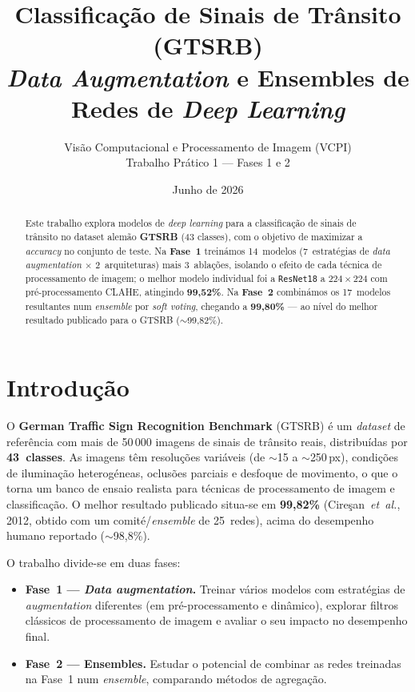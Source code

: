 \documentclass[11pt,a4paper]{article}
\title{\textbf{Classificação de Sinais de Trânsito (GTSRB)}\\[0.3em]
\large \emph{Data Augmentation} e Ensembles de Redes de \emph{Deep Learning}}
\author{Visão Computacional e Processamento de Imagem (VCPI)\\ Trabalho Prático 1 --- Fases 1 e 2}
\date{Junho de 2026}
\begin{document}
\maketitle

\begin{abstract}
\noindent
Este trabalho explora modelos de \emph{deep learning} para a classificação de sinais de
trânsito no dataset alemão \textbf{GTSRB} (43 classes), com o objetivo de maximizar a
\emph{accuracy} no conjunto de teste. Na \textbf{Fase~1} treinámos 14~modelos
(7~estratégias de \emph{data augmentation} $\times$ 2~arquiteturas) mais 3~ablações,
isolando o efeito de cada técnica de processamento de imagem; o melhor modelo individual
foi a \texttt{ResNet18} a $224\times224$ com pré-processamento CLAHE, atingindo
\textbf{99{,}52\%}. Na \textbf{Fase~2} combinámos os 17~modelos resultantes num
\emph{ensemble} por \emph{soft voting}, chegando a \textbf{99{,}80\%} --- ao nível do
melhor resultado publicado para o GTSRB ($\sim$99{,}82\%).
\end{abstract}

\tableofcontents
\vspace{1em}

\section{Introdução}

O \textbf{German Traffic Sign Recognition Benchmark} (GTSRB) é um \emph{dataset} de
referência com mais de 50\,000 imagens de sinais de trânsito reais, distribuídas por
\textbf{43~classes}. As imagens têm resoluções variáveis (de $\sim$15 a $\sim$250\,px),
condições de iluminação heterogéneas, oclusões parciais e desfoque de movimento, o que o
torna um banco de ensaio realista para técnicas de processamento de imagem e
classificação. O melhor resultado publicado situa-se em \textbf{99{,}82\%}
(Cireşan~\emph{et~al.}, 2012, obtido com um comité/\emph{ensemble} de 25~redes), acima do
desempenho humano reportado ($\sim$98{,}8\%).

O trabalho divide-se em duas fases:
\begin{itemize}[nosep]
  \item \textbf{Fase~1 --- \emph{Data augmentation}.} Treinar vários modelos com
  estratégias de \emph{augmentation} diferentes (em pré-processamento e dinâmico),
  explorar filtros clássicos de processamento de imagem e avaliar o seu impacto no
  desempenho final.
  \item \textbf{Fase~2 --- Ensembles.} Estudar o potencial de combinar as redes treinadas
  na Fase~1 num \emph{ensemble}, comparando métodos de agregação.
\end{itemize}
\end{document}
